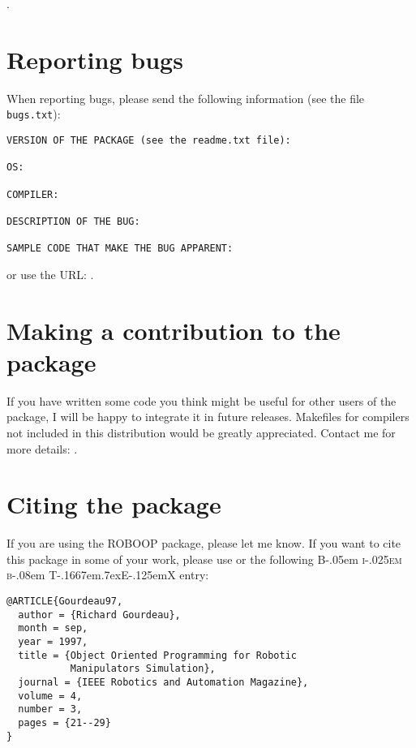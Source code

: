 \documentclass[11pt,fleqn,letterpaper]{report}
\begin{document}
{\tt {}}.

\section{Reporting bugs}

When reporting bugs, please send the following information (see the file {\tt bugs.txt}):
\begin{verbatim}
VERSION OF THE PACKAGE (see the readme.txt file):

OS:

COMPILER:

DESCRIPTION OF THE BUG:

SAMPLE CODE THAT MAKE THE BUG APPARENT:

\end{verbatim}
or use the URL: {\tt {}}.


\section{Making a contribution to the package}

If you have written some code you think might be useful for other users of the package,
I will be happy to integrate it in future releases. Makefiles for compilers not included
in this distribution would be greatly appreciated. Contact me for more details: 
{\tt {}}.

\section{Citing the package}

If you are using the \textsf{ROBOOP} package, please let me know. If you want to cite this package
in some of your work, please use \cite{Gourdeau97} or the following {\rmfamily B\kern-.05em%
    \textsc{i\kern-.025em b}\kern-.08em%
    T\kern-.1667em\lower.7ex\hbox{E}\kern-.125emX} entry:
\begin{verbatim}
@ARTICLE{Gourdeau97,
  author = {Richard Gourdeau},
  month = sep,
  year = 1997,
  title = {Object Oriented Programming for Robotic
           Manipulators Simulation},
  journal = {IEEE Robotics and Automation Magazine},
  volume = 4,
  number = 3,
  pages = {21--29}
}
\end{verbatim}
\end{document}
